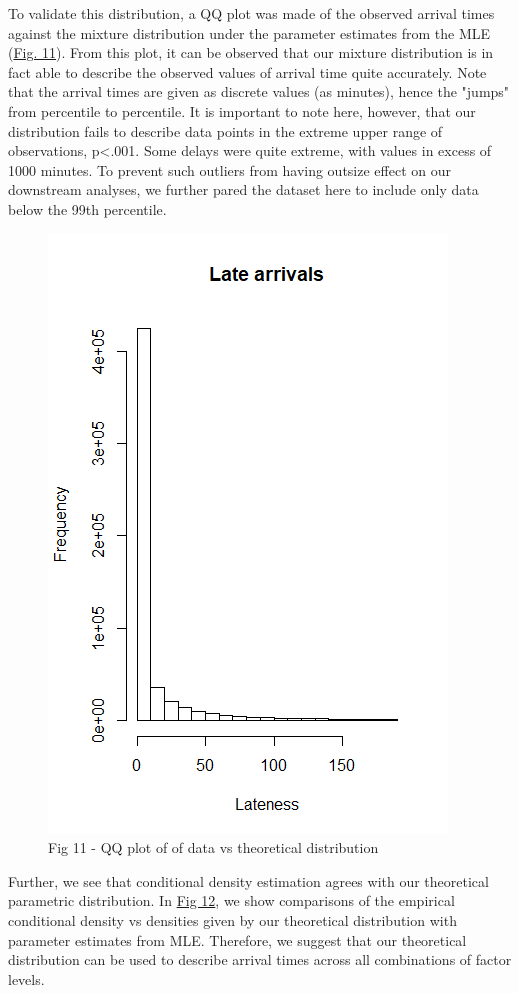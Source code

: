 \documentclass[12pt, a4paper, openany]{book}
\newcommand\tab[1][1cm]{\hspace*{#1}}
\begin{document}
	\tab To validate this distribution, a QQ plot was made of the observed arrival times against the mixture distribution under the parameter estimates from the MLE (\underline{Fig. 11}). From this plot, it can be observed that our mixture distribution is in fact able to describe the observed values of arrival time quite accurately. Note that the arrival times are given as discrete values (as minutes), hence the "jumps" from percentile to percentile. It is important to note here, however, that our distribution fails to describe data points in the extreme upper range of observations, p<.001. Some delays were quite extreme, with values in excess of 1000 minutes. To prevent such outliers from having outsize effect on our downstream analyses, we further pared the dataset here to include only data below the 99th percentile.  \\
			\begin{figure}
			\centering
	 		\includegraphics[width = .45 \textwidth]{../figures/LateArrivalsHistogram}
	 		\caption{Fig 11  - QQ plot of of data vs theoretical distribution}
	 		\end{figure}
	\tab Further, we see that conditional density estimation agrees with our theoretical parametric distribution. In \underline{Fig 12}, we show comparisons of the empirical conditional density vs densities given by our theoretical distribution with parameter estimates from MLE. Therefore, we suggest that our theoretical distribution can be used to describe arrival times across all combinations of factor levels. \\
\end{document}
